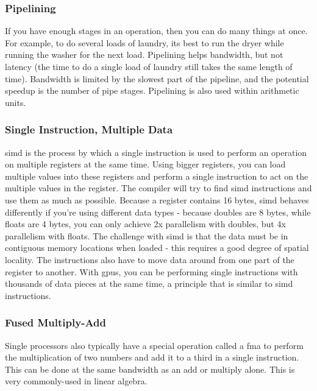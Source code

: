 \documentclass[10pt]{article}
\begin{document}
\begin{flushleft}
\subsubsection{Pipelining}

If you have enough stages in an operation, then you can do many things at once. For example, to do several loads of laundry, its best to run the dryer while running the washer for the next load. Pipelining helps bandwidth, but not latency (the time to do a single load of laundry still takes the same length of time). Bandwidth is limited by the slowest part of the pipeline, and the potential speedup is the number of pipe stages. Pipelining is also used within arithmetic units. 

\subsubsection{Single Instruction, Multiple Data}

\gls{simd} is the process by which a single instruction is used to perform an operation on multiple registers at the same time. Using bigger registers, you can load multiple values into these registers and perform a single instruction to act on the multiple values in the register. The compiler will try to find \gls{simd} instructions and use them as much as possible. Because a register contains 16 bytes, \gls{simd} behaves differently if you're using different data types - because doubles are 8 bytes, while floats are 4 bytes, you can only achieve 2x parallelism with doubles, but 4x parallelism with floats. The challenge with \gls{simd} is that the data must be in contiguous memory locations when loaded - this requires a good degree of spatial locality. The instructions also have to move data around from one part of the register to another. With \gls{gpu}s, you can be performing single instructions with thousands of data pieces at the same time, a principle that is similar to \gls{simd} instructions. 

\subsubsection{Fused Multiply-Add}

Single processors also typically have a special operation called a \gls{fma} to perform the multiplication of two numbers and add it to a third in a single instruction. This can be done at the same bandwidth as an add or multiply alone. This is very commonly-used in linear algebra.


\end{flushleft}
\end{document}
